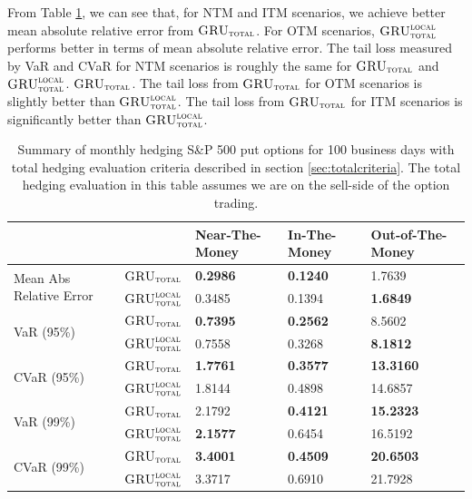 \documentclass[letterpaper,12pt,titlepage,oneside,final]{book}
\numberwithin{equation}{section}
\theoremstyle{definition}
\newcommand{\modelT}{\textsc{GRU}_{\textsc{total}}}
\newcommand{\modelL}{\textsc{GRU}_{\textsc{total}}^{\textsc{local}}}
\begin{document}
From Table \ref{table:AppputTotalM}, we can see that, for NTM and ITM scenarios, we achieve better  mean absolute relative error from $\modelT$. For OTM scenarios,   $\modelL$ performs better in terms of mean absolute relative error. The tail loss measured by VaR and CVaR for NTM scenarios is roughly the same for $\modelT$ and $\modelL$. $\modelT$. The tail loss from $\modelT$ for OTM scenarios is slightly better than $\modelL$. The tail loss from $\modelT$ for ITM scenarios is significantly better than $\modelL$.
\begin{table}[htp!]
	\centering
	\begin{tabular}{ll|l|l|l|}
		\cline{3-5}
		&          & Near-The-Money   & In-The-Money     & Out-of-The-Money  \\ \hline
		\multicolumn{1}{|l|}{\multirow{2}{*}{Mean Abs Relative Error}} & $\modelT$    & \textbf{0.2986}  & \textbf{0.1240}  & 1.7639            \\  
		\multicolumn{1}{|l|}{}                                & $\modelL$    & 0.3485           & 0.1394           & \textbf{1.6849}   \\   \hline
		\multicolumn{1}{|l|}{\multirow{2}{*}{VaR (95\%)}}     & $\modelT$    & \textbf{0.7395} & \textbf{0.2562} & 8.5602           \\  
		\multicolumn{1}{|l|}{}                                & $\modelL$    & 0.7558          & 0.3268          & \textbf{8.1812}  \\   \hline
		\multicolumn{1}{|l|}{\multirow{2}{*}{CVaR (95\%)}}    & $\modelT$    & \textbf{1.7761}          & \textbf{0.3577} & \textbf{13.3160} \\  
		\multicolumn{1}{|l|}{}                                & $\modelL$    & 1.8144          & 0.4898          & 14.6857          \\   \hline
		\multicolumn{1}{|l|}{\multirow{2}{*}{VaR (99\%)}}     & $\modelT$    & 2.1792          & \textbf{0.4121} & \textbf{15.2323}          \\  
		\multicolumn{1}{|l|}{}                                & $\modelL$    & \textbf{2.1577} & 0.6454          & 16.5192          \\   \hline
		\multicolumn{1}{|l|}{\multirow{2}{*}{CVaR (99\%)}}    & $\modelT$    & \textbf{3.4001}          & \textbf{0.4509}  & \textbf{20.6503} \\  
		\multicolumn{1}{|l|}{}                                & $\modelL$    & 3.3717          & 0.6910          & 21.7928          \\   \hline
	\end{tabular}
	\caption{Summary of monthly hedging S\&P 500 put options for 100 business days with total hedging evaluation criteria described in section \ref{sec:totalcriteria}. The total hedging evaluation in this table assumes we are on the sell-side of the option trading.}
	\label{table:AppputTotalM}
\end{table}
\end{document}
